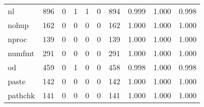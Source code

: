 \begin{longtable}{lp{2.0cm}p{2.0cm}p{2.0cm}p{2.0cm}p{2.0cm}p{2.0cm}p{2.0cm}p{2.0cm}p{2.0cm}}
nl        &                    896 &                                  0 &                                 1 &                                1 &                                 0 &                             894 &                                   0.999 &                                  1.000 &                                0.998 \\
nohup     &                    162 &                                  0 &                                 0 &                                0 &                                 0 &                             162 &                                   1.000 &                                  1.000 &                                1.000 \\
nproc     &                    139 &                                  0 &                                 0 &                                0 &                                 0 &                             139 &                                   1.000 &                                  1.000 &                                1.000 \\
numfmt    &                    291 &                                  0 &                                 0 &                                0 &                                 0 &                             291 &                                   1.000 &                                  1.000 &                                1.000 \\
od        &                    459 &                                  0 &                                 1 &                                0 &                                 0 &                             458 &                                   0.998 &                                  1.000 &                                0.998 \\
paste     &                    142 &                                  0 &                                 0 &                                0 &                                 0 &                             142 &                                   1.000 &                                  1.000 &                                1.000 \\
pathchk   &                    141 &                                  0 &                                 0 &                                0 &                                 0 &                             141 &                                   1.000 &                                  1.000 &                                1.000 \\

\end{longtable}
